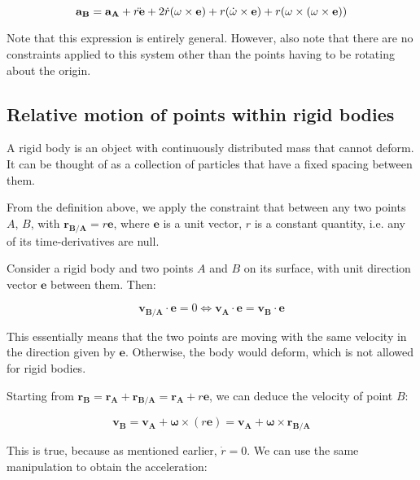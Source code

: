 \documentclass[12pt]{article}
\begin{document}
\[ \mathbf{a_B} = \mathbf{a_A} + \Ddot{r\mathbf{e}} + 2\dot{r}(\mathbf{\omega} \times \mathbf{e}) + r(\dot{\mathbf{\omega}} \times \mathbf{e}) + r(\mathbf{\omega} \times (\mathbf{\omega} \times \mathbf{e})) \]

Note that this expression is entirely general. However, also note that there are no constraints applied to this system other than the points having to be rotating about the origin.

\subsection{Relative motion of points within rigid bodies}

\begin{definition}
    A rigid body is an object with continuously distributed mass that cannot deform. It can be thought of as a collection of particles that have a fixed spacing between them.
\end{definition}

\begin{proposition}
    From the definition above, we apply the constraint that between any two points $A$, $B$, with $\mathbf{r_{B/A}} = r\mathbf{e}$, where $\mathbf{e}$ is a unit vector, $r$ is a constant quantity, i.e. any of its time-derivatives are null.
\end{proposition}

\begin{proposition}
    Consider a rigid body and two points $A$ and $B$ on its surface, with unit direction vector $\mathbf{e}$ between them. Then:

    \[ \mathbf{v_{B/A}} \cdot \mathbf{e} = 0 \Leftrightarrow \mathbf{v_A} \cdot \mathbf{e} = \mathbf{v_B} \cdot \mathbf{e} \]

    This essentially means that the two points are moving with the same velocity in the direction given by $\mathbf{e}$. Otherwise, the body would deform, which is not allowed for rigid bodies.
\end{proposition}

Starting from $\mathbf{r_B} = \mathbf{r_A} + \mathbf{r_{B/A}} = \mathbf{r_A} + r\mathbf{e}$, we can deduce the velocity of point $B$:

\[ \mathbf{v_B} = \mathbf{v_A} + \mathbf{\omega} \times (r\mathbf{e}) = \mathbf{v_A} + \mathbf{\omega} \times \mathbf{r_{B/A}} \]

This is true, because as mentioned earlier, $\dot{r} = 0$. We can use the same manipulation to obtain the acceleration:
\end{document}
